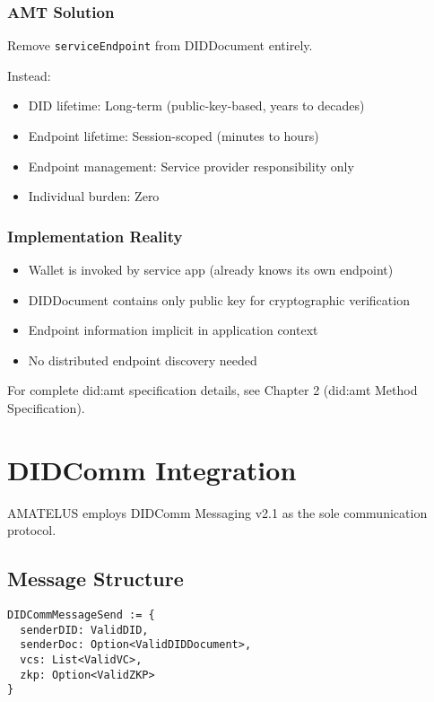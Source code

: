 \subsubsection{AMT Solution}

Remove \texttt{serviceEndpoint} from DIDDocument entirely.

Instead:
\begin{itemize}
  \item DID lifetime: Long-term (public-key-based, years to decades)
  \item Endpoint lifetime: Session-scoped (minutes to hours)
  \item Endpoint management: Service provider responsibility only
  \item Individual burden: Zero
\end{itemize}

\subsubsection{Implementation Reality}

\begin{itemize}
  \item Wallet is invoked by service app (already knows its own endpoint)
  \item DIDDocument contains only public key for cryptographic verification
  \item Endpoint information implicit in application context
  \item No distributed endpoint discovery needed
\end{itemize}

For complete did:amt specification details, see Chapter 2 (did:amt Method Specification).

\section{DIDComm Integration}

AMATELUS employs DIDComm Messaging v2.1 as the sole communication protocol.

\subsection{Message Structure}

\begin{verbatim}
DIDCommMessageSend := {
  senderDID: ValidDID,
  senderDoc: Option<ValidDIDDocument>,
  vcs: List<ValidVC>,
  zkp: Option<ValidZKP>
}
\end{verbatim}

